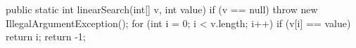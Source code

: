 \begin{unipdcode}[language=Java]
public static int linearSearch(int[] v, int value) {
    if (v == null) throw new IllegalArgumentException();
    for (int i = 0; i < v.length; i++)
        if (v[i] == value) return i;
    return -1;
}
\end{unipdcode}
